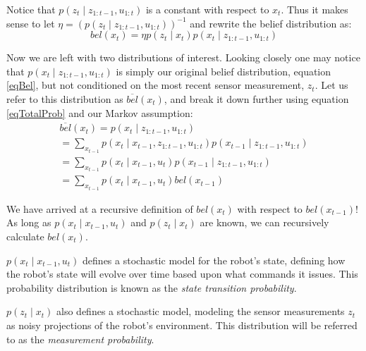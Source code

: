 Notice that \(p(z_t \mathbin{\vert} z_{1:t-1}, u_{1:t})\) is a constant with respect to \(x_t\). Thus it makes sense to let \(\eta = (p(z_t \mathbin{\vert} z_{1:t-1}, u_{1:t}))^{-1}\) and rewrite the belief distribution as:
\begin{equation}
bel(x_t) = \eta p(z_t \mathbin{\vert} x_t) p(x_t \mathbin{\vert} z_{1:t-1}, u_{1:t})
\end{equation}

Now we are left with two distributions of interest. Looking closely one may notice that \(p(x_t \mathbin{\vert} z_{1:t-1}, u_{1:t})\) is simply our original belief distribution, equation \ref{eqBel}, but not conditioned on the most recent sensor measurement, \(z_t\). Let us refer to this distribution as \(\overline{bel}(x_t)\), and break it down further using equation \ref{eqTotalProb} and our Markov assumption:
\begin{multline}
\overline{bel}(x_t) = p(x_t \mathbin{\vert} z_{1:t-1}, u_{1:t}) \\
= \sum\limits_{x_{t-1}} p(x_t \mathbin{\vert} x_{t-1}, z_{1:t-1}, u_{1:t}) p(x_{t-1} \mathbin{\vert} z_{1:t-1}, u_{1:t}) \\
= \sum\limits_{x_{t-1}} p(x_t \mathbin{\vert} x_{t-1}, u_t) p(x_{t-1} \mathbin{\vert} z_{1:t-1}, u_{1:t}) \\
= \sum\limits_{x_{t-1}} p(x_t \mathbin{\vert} x_{t-1}, u_t) bel(x_{t-1})
\end{multline}

We have arrived at a recursive definition of \(bel(x_t)\) with respect to \(bel(x_{t-1})\)! As long as \(p(x_t \mathbin{\vert} x_{t-1}, u_t)\) and \(p(z_t \mathbin{\vert} x_t)\) are known, we can recursively calculate \(bel(x_t)\).

\(p(x_t \mathbin{\vert} x_{t-1}, u_t)\) defines a stochastic model for the robot's state, defining how the robot's state will evolve over time based upon what commands it issues. This probability distribution is known as the \textit{state transition probability}. \cite{}

\(p(z_t \mathbin{\vert} x_t)\) also defines a stochastic model, modeling the sensor measurements \(z_t\) as noisy projections of the robot's environment. This distribution will be referred to as the \textit{measurement probability}. \cite{}

